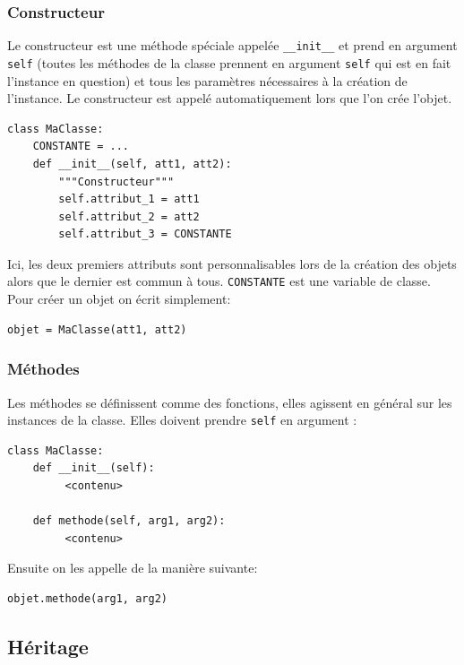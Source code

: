 \documentclass[a4paper, 10pt]{article}
\newcommand{\code}[1]{{\small\texttt{#1}}}
\begin{document}
\subsubsection{Constructeur}\index{\code{\_\_init\_\_}}

Le constructeur est une méthode spéciale appelée {\footnotesize\verb|__init__|} et prend en argument \code{self}\index{\code{self}} (toutes les méthodes de la classe prennent en argument \code{self} qui est en fait l'instance en question) et tous les paramètres nécessaires à la création de l'instance. Le constructeur est appelé automatiquement lors que l'on crée l'objet.
\begin{verbatim}
class MaClasse:
    CONSTANTE = ...
    def __init__(self, att1, att2):
        """Constructeur"""
        self.attribut_1 = att1
        self.attribut_2 = att2
        self.attribut_3 = CONSTANTE
\end{verbatim}
Ici, les deux premiers attributs sont personnalisables lors de la création des objets alors que le dernier est commun à tous. \code{CONSTANTE} est une variable de classe. Pour créer un objet on écrit simplement:
\begin{verbatim}
objet = MaClasse(att1, att2)
\end{verbatim}

\subsubsection{Méthodes}
Les méthodes se définissent comme des fonctions, elles agissent en général sur les instances de la classe. Elles doivent prendre \code{self} en argument :
\begin{verbatim}
class MaClasse:
    def __init__(self):
         <contenu>

    def methode(self, arg1, arg2):
         <contenu>
\end{verbatim}

Ensuite on les appelle de la manière suivante:
\begin{verbatim}
objet.methode(arg1, arg2)
\end{verbatim}


\subsection{Héritage}
\end{document}
